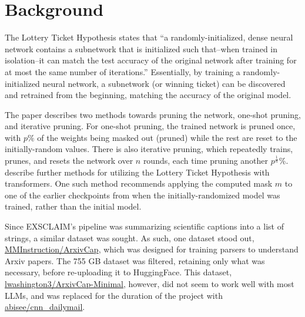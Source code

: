 \documentclass[
	title={Lottery Ticket Hypothesis for Large Language Models}
]{cs595project}
\begin{document}
\section{Background}\label{sec:background}
The Lottery Ticket Hypothesis states that ``a randomly-initialized, dense neural network contains a subnetwork that is initialized such that--when trained in isolation--it can match the test accuracy of the original network after training for at most the same number of iterations.''\supercite{Lottery-Ticket-Hypothesis}
Essentially, by training a randomly-initialized neural network, a subnetwork (or winning ticket) can be discovered and retrained from the beginning, matching the accuracy of the original model.

The paper describes two methods towards pruning the network, one-shot pruning, and iterative pruning.
For one-shot pruning, the trained network is pruned once, with $p\%$ of the weights being masked out (pruned) while the rest are reset to the initially-random values.
There is also iterative pruning, which repeatedly trains, prunes, and resets the network over $n$ rounds, each time pruning another $p^\frac{1}{n}$\%.
\citeauthor{LTH-Transformer} describe further methods for utilizing the Lottery Ticket Hypothesis with transformers.
One such method recommends applying the computed mask $m$ to one of the earlier checkpoints from when the initially-randomized model was trained, rather than the initial model.

Since EXSCLAIM's pipeline was summarizing scientific captions into a list of strings, a similar dataset was sought. %
As such, one dataset stood out, \href{https://huggingface.co/datasets/MMInstruction/ArxivCap}{MMInstruction/ArxivCap},\supercite{li-etal-2024-multimodal-arxiv} which was designed for training parsers to understand Arxiv papers.
The 755 GB dataset was filtered, retaining only what was necessary, before re-uploading it to HuggingFace.
This dataset, \href{https://huggingface.co/datasets/lwashington3/ArxivCap-Minimal}{lwashington3/ArxivCap-Minimal}, however, did not seem to work well with most LLMs, and was replaced for the duration of the project with \href{https://huggingface.co/datasets/abisee/cnn_dailymail/tree/96df5e686bee6baa90b8bee7c28b81fa3fa6223d}{abisee/cnn\_dailymail}.
\end{document}
